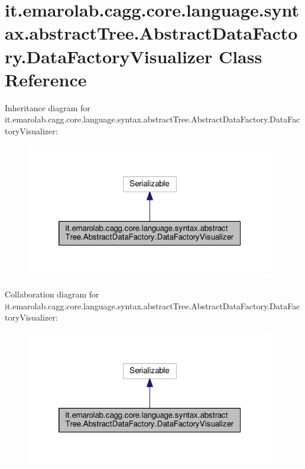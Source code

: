 \hypertarget{classit_1_1emarolab_1_1cagg_1_1core_1_1language_1_1syntax_1_1abstractTree_1_1AbstractDataFactory_1_1DataFactoryVisualizer}{\section{it.\-emarolab.\-cagg.\-core.\-language.\-syntax.\-abstract\-Tree.\-Abstract\-Data\-Factory.\-Data\-Factory\-Visualizer Class Reference}
\label{classit_1_1emarolab_1_1cagg_1_1core_1_1language_1_1syntax_1_1abstractTree_1_1AbstractDataFactory_1_1DataFactoryVisualizer}
}


Inheritance diagram for it.\-emarolab.\-cagg.\-core.\-language.\-syntax.\-abstract\-Tree.\-Abstract\-Data\-Factory.\-Data\-Factory\-Visualizer\-:\nopagebreak
\begin{figure}[H]
\begin{center}
\leavevmode
\includegraphics[width=308pt]{classit_1_1emarolab_1_1cagg_1_1core_1_1language_1_1syntax_1_1abstractTree_1_1AbstractDataFactory0c1cc63b40108640864ef67dfc5b1ede}
\end{center}
\end{figure}


Collaboration diagram for it.\-emarolab.\-cagg.\-core.\-language.\-syntax.\-abstract\-Tree.\-Abstract\-Data\-Factory.\-Data\-Factory\-Visualizer\-:\nopagebreak
\begin{figure}[H]
\begin{center}
\leavevmode
\includegraphics[width=308pt]{classit_1_1emarolab_1_1cagg_1_1core_1_1language_1_1syntax_1_1abstractTree_1_1AbstractDataFactory67d1e382656545e5c9c4bde70a79eee0}
\end{center}
\end{figure}
